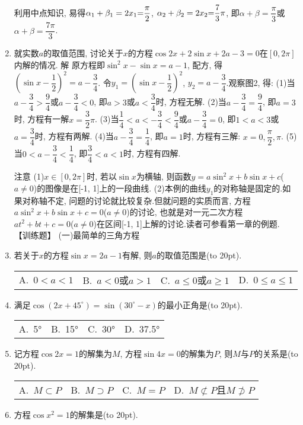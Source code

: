 \documentclass[10pt,a4paper]{article}
\newcommand{\bracket}[1]{(\hbox to #1pt{})}
\newcommand{\fourch}[4]{\par\begin{tabular}{p{.23\textwidth}p{.23\textwidth}p{.23\textwidth}p{.23\textwidth}}
A.~#1 &B.~#2& C.~#3& D.~#4
\end{tabular}}
\begin{document}
\begin{enumerate}[1.]
利用中点知识, 易得$\alpha _1+\beta _1=2x_1\text=\dfrac{\pi }2$, $\alpha _2+\beta _2=2x_2\text=\dfrac 73\pi$, 即$\alpha +\beta =\dfrac{\pi }3$或$\alpha +\beta =\dfrac{7\pi }3$.
\item 就实数$a$的取值范围, 讨论关于$x$的方程$\cos 2x+2\sin x+2a-3=0$在$[0,2\pi]$内解的情况.
解  原方程即$\sin ^2x-\sin x=a-1$, 配方, 得$(\sin x-\dfrac 12)^2=a-\dfrac 34$.
令$y_1=(\sin x-\dfrac 12)^2$, $y_2=a-\dfrac 34$.观察图2, 得:
(1)当$a-\dfrac 34>\dfrac 94$或$a-\dfrac 34<0$, 即$a>3$或$a<\dfrac 34$时, 方程无解.
(2)当$a-\dfrac 34=\dfrac 94$, 即$a=3$时, 方程有一解$x=\dfrac 32\pi$.
(3)当$\dfrac 14<a<-\dfrac 34<\dfrac 94$或$a-\dfrac 34=0$, 即$1<a<3$或$a=\dfrac 34$时, 方程有两解.
(4)当$a-\dfrac 34=\dfrac 14$, 即$a=1$时, 方程有三解: $x=0,\dfrac{\pi }2,\pi$.
(5)当$0<a-\dfrac 34<\dfrac 14$, 即$\dfrac 34<a<1$时, 方程有四解.
\begin{center}
\end{center}
注意  (1)$x\in [0,2\pi]$时, 若以$\sin x$为横轴, 则函数$y=a\sin ^2x+b\sin x+c$($a\ne 0$)的图像是在[-1, 1]上的一段曲线.
(2)本例的曲线$y_1$的对称轴是固定的.如果对称轴不定, 问题的讨论就比较复杂.但就问题的实质而言, 方程$a\sin ^2x+b\sin x+c=0$($a\ne 0$)的讨论, 也就是对一元二次方程$at^2+bt+c=0$($a\ne 0$)在区间[-1, 1]上解的讨论.读者可参看第一章的例题.
【训练题】
(一)最简单的三角方程
\item 若关于$x$的方程$\sin x=2a-1$有解, 则$a$的取值范围是\bracket{20}.
\fourch{$0<a<1$}{$a<0$或$a>1$}{$a\le 0$或$a\ge 1$}{$0\le a\le 1$}
\item 满足$\cos (2x+45^\circ)=\sin (30^\circ -x)$的最小正角是\bracket{20}.
\fourch{5°}{15°}{30°}{37.5°}
\item 记方程$\cos 2x=1$的解集为$M$, 方程$\sin 4x=0$的解集为$P$, 则$M$与$P$的关系是\bracket{20}.
\fourch{$M\subset P$}{$M\supset P$}{$M=P$}{$M\not\subset P$且$M\not\supset P$}
\item 方程$\cos x^2=1$的解集是\bracket{20}.

\end{enumerate}
\end{document}
